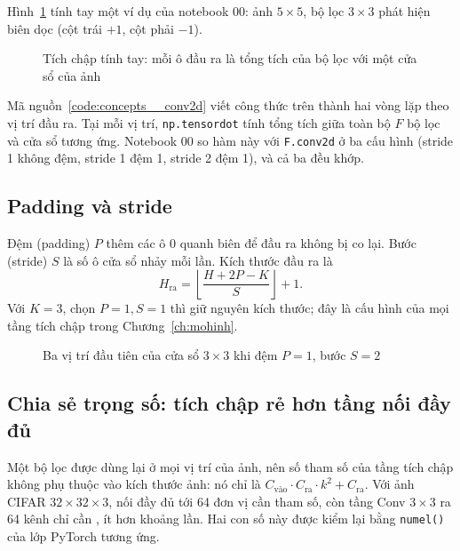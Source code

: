 Hình~\ref{fig:tichchap} tính tay một ví dụ của notebook 00: ảnh $5\times5$, bộ lọc $3\times3$ phát hiện
biên dọc (cột trái $+1$, cột phải $-1$).

\begin{figure}[H]
  \centering
  \caption{Tích chập tính tay: mỗi ô đầu ra là tổng tích của bộ lọc với một cửa sổ của ảnh}
  \label{fig:tichchap}
\end{figure}

Mã nguồn~\ref{code:concepts__conv2d} viết công thức trên thành hai vòng lặp theo vị trí đầu ra. Tại mỗi
vị trí, \texttt{np.tensordot} tính tổng tích giữa toàn bộ $F$ bộ lọc và cửa sổ tương ứng. Notebook 00 so
hàm này với \texttt{F.conv2d} ở ba cấu hình (stride 1 không đệm, stride 1 đệm 1, stride 2 đệm 1), và cả
ba đều khớp.


\subsection{Padding và stride}

Đệm (padding) $P$ thêm các ô 0 quanh biên để đầu ra không bị co lại. Bước (stride) $S$ là số ô cửa sổ nhảy
mỗi lần. Kích thước đầu ra là
\[
  H_{\text{ra}} = \left\lfloor \frac{H + 2P - K}{S} \right\rfloor + 1 .
\]
Với $K=3$, chọn $P=1, S=1$ thì giữ nguyên kích thước; đây là cấu hình của mọi tầng tích chập trong
Chương~\ref{ch:mohinh}.

\begin{figure}[H]
  \centering
  \caption{Ba vị trí đầu tiên của cửa sổ $3\times3$ khi đệm $P=1$, bước $S=2$}
  \label{fig:padstride}
\end{figure}


\subsection{Chia sẻ trọng số: tích chập rẻ hơn tầng nối đầy đủ}

Một bộ lọc được dùng lại ở mọi vị trí của ảnh, nên số tham số của tầng tích chập không phụ thuộc vào kích
thước ảnh: nó chỉ là $C_{\text{vào}}\cdot C_{\text{ra}}\cdot k^2 + C_{\text{ra}}$. Với ảnh CIFAR $32\times32\times3$,
nối đầy đủ tới 64 đơn vị cần  tham số, còn tầng Conv $3\times3$ ra 64 kênh chỉ cần
, ít hơn khoảng  lần. Hai con số này được kiểm lại bằng
\texttt{numel()} của lớp PyTorch tương ứng.

